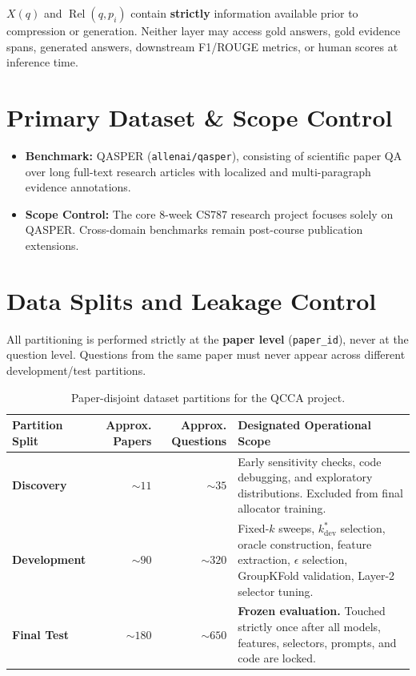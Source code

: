\documentclass[11pt,a4paper]{article}
\begin{document}
\begin{warningbox}
$X(q)$ and $\operatorname{Rel}(q, p_i)$ contain \textbf{strictly} information available prior to compression or generation. Neither layer may access gold answers, gold evidence spans, generated answers, downstream F1/ROUGE metrics, or human scores at inference time.
\end{warningbox}

\section{Primary Dataset \& Scope Control}
\begin{itemize}
    \item \textbf{Benchmark:} QASPER (\texttt{allenai/qasper}), consisting of scientific paper QA over long full-text research articles with localized and multi-paragraph evidence annotations.
    \item \textbf{Scope Control:} The core 8-week CS787 research project focuses solely on QASPER. Cross-domain benchmarks remain post-course publication extensions.
\end{itemize}

\section{Data Splits and Leakage Control}
\begin{warningbox}
All partitioning is performed strictly at the \textbf{paper level} (\texttt{paper\_id}), never at the question level. Questions from the same paper must never appear across different development/test partitions.
\end{warningbox}

\begin{table}[H]
\centering
\small
\begin{tabularx}{\textwidth}{lrrX}
\toprule
\textbf{Partition Split} & \textbf{Approx. Papers} & \textbf{Approx. Questions} & \textbf{Designated Operational Scope} \\
\midrule
\textbf{Discovery} & $\sim 11$ & $\sim 35$ & Early sensitivity checks, code debugging, and exploratory distributions. Excluded from final allocator training. \\
\textbf{Development} & $\sim 90$ & $\sim 320$ & Fixed-$k$ sweeps, $k_{\text{dev}}^*$ selection, oracle construction, feature extraction, $\epsilon$ selection, GroupKFold validation, Layer-2 selector tuning. \\
\textbf{Final Test} & $\sim 180$ & $\sim 650$ & \textbf{Frozen evaluation.} Touched strictly once after all models, features, selectors, prompts, and code are locked. \\
\bottomrule
\end{tabularx}
\caption{Paper-disjoint dataset partitions for the QCCA project.}
\end{table}
\end{document}
